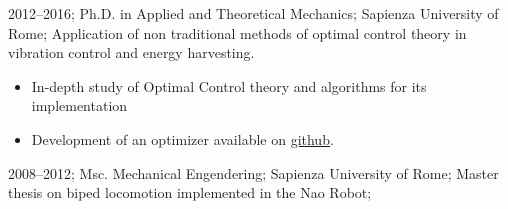 \addstudy%
{%
    2012--2016;%
    Ph.D. in Applied and Theoretical Mechanics;%
    Sapienza University of Rome;%
    Application of non traditional methods of optimal control theory in vibration control and energy harvesting.%
    \begin{itemize}
        \item In-depth study of Optimal Control theory and algorithms for its implementation
        \item Development of an optimizer available on \href{https://github.com/rafaelrojasmiliani/krotov_ch6}{github}.
    \end{itemize}
}%

\addstudy%
{%
    2008--2012;%
    Msc. Mechanical Engendering;%
    Sapienza University of Rome;%
    Master thesis on biped locomotion implemented in the Nao Robot;%
}%
